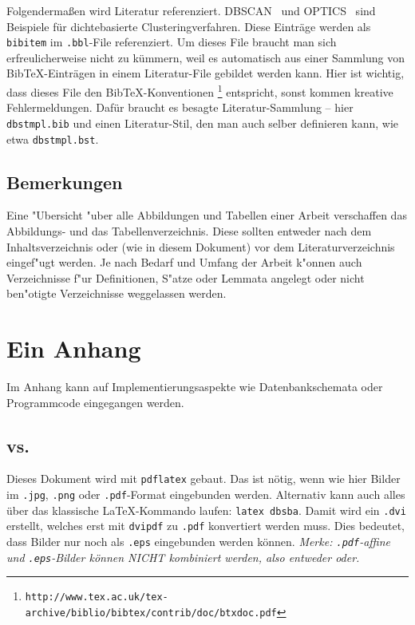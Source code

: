 \documentclass[pdftex,12pt,a4paper]{report}
\begin{document}
Folgenderma\ss en wird Literatur referenziert.
DBSCAN~\cite{EKSX96} und OPTICS~\cite{ABKS99} sind Beispiele f\"ur
dichtebasierte Clusteringverfahren. Diese Eintr\"age werden als
{\tt bibitem} im {\tt .bbl}-File referenziert. Um dieses File braucht man
sich erfreulicherweise nicht zu k\"ummern, weil es automatisch aus einer
Sammlung von BibTeX-Eintr\"agen in einem Literatur-File gebildet werden
kann. Hier ist wichtig, dass dieses File den BibTeX-Konventionen
\footnote{{\tt http://www.tex.ac.uk/tex-archive/biblio/bibtex/contrib/doc/btxdoc.pdf}}
entspricht, sonst kommen kreative Fehlermeldungen. Daf\"ur braucht es
besagte Literatur-Sammlung -- hier {\tt dbstmpl.bib}
und einen Literatur-Stil, den man auch selber definieren kann, wie
etwa {\tt dbstmpl.bst}.

\section{Bemerkungen}

Eine "Ubersicht "uber alle Abbildungen und Tabellen einer Arbeit
verschaffen das Abbildungs- und das Tabellenverzeichnis. Diese
sollten entweder nach dem Inhaltsverzeichnis oder (wie in diesem
Dokument) vor dem Literaturverzeichnis eingef"ugt werden.
Je nach Bedarf und Umfang der Arbeit k"onnen auch Verzeichnisse
f"ur Definitionen, S"atze oder Lemmata angelegt oder nicht
ben"otigte Verzeichnisse weggelassen werden.

\appendix

\chapter{Ein Anhang}

Im Anhang kann auf Implementierungsaspekte wie Datenbankschemata
oder Programmcode eingegangen werden.

\section{ vs.\ }

Dieses Dokument wird mit {\tt pdflatex} gebaut. Das ist n\"otig, wenn
wie hier Bilder im {\tt .jpg}, {\tt .png} oder {\tt .pdf}-Format eingebunden
werden. Alternativ kann auch alles \"uber das klassische \LaTeX-Kommando
laufen: \verb=latex dbsba=. Damit wird ein {\tt .dvi} erstellt, welches
erst mit {\tt dvipdf} zu {\tt .pdf} konvertiert werden muss. Dies
bedeutet, dass Bilder nur noch als {\tt .eps} eingebunden werden
k\"onnen. {\em Merke: {\tt .pdf}-affine und {\tt .eps}-Bilder k\"onnen
NICHT kombiniert werden, also entweder oder.}
\end{document}
